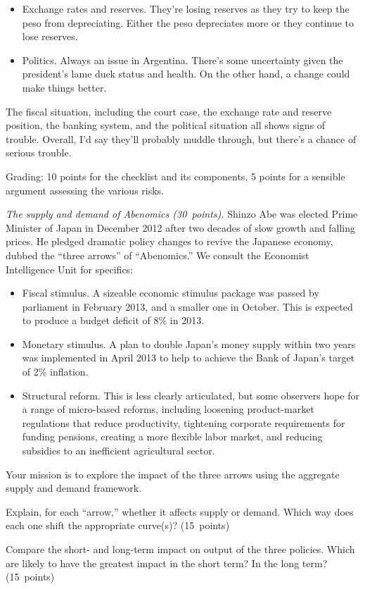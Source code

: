 \documentclass[letterpaper,12pt]{exam}
\begin{document}
\begin{questions}
\begin{solution}
\begin{parts}
\begin{itemize}
\item Exchange rates and reserves.
They're losing reserves as they try to keep the peso
from depreciating.
Either the peso depreciates more or they continue to lose reserves.

\item Politics.  Always an issue in Argentina.
There's some uncertainty given the president's lame duck status and health.
On the other hand, a change could make things better.
\end{itemize}
%
The fiscal situation, including the court case, the exchange rate and reserve position,
the banking system, and the political situation all shows signs of trouble.
Overall, I'd say they'll probably muddle through,
but there's a chance of serious trouble.

Grading:  10 points for the checklist and its components,
5 points for a sensible argument assessing the various risks.
\end{parts}
\end{solution}


\item  {\it The supply and demand of Abenomics (30~points).\/}
Shinzo Abe was elected Prime Minister of Japan in December 2012
after two decades of slow growth and falling prices.
He pledged dramatic policy changes to revive the Japanese economy,
dubbed the ``three arrows'' of ``Abenomics.''
We consult the Economist Intelligence Unit for specifics:
%
\begin{itemize}
\item Fiscal stimulus.  A sizeable economic stimulus package was passed by parliament in
February 2013, and a smaller one in October.
This is expected to produce a budget deficit of 8\% in 2013.
\item Monetary stimulus. A plan to double Japan's
money supply within two years was implemented in April 2013 to help to achieve the Bank of Japan's
target of 2\%  inflation.
\item Structural reform.
This is less clearly articulated, but some observers hope for a range of micro-based reforms,
including loosening product-market regulations that reduce productivity,
tightening corporate requirements for funding pensions,
creating a more flexible labor market,
and reducing subsidies to an inefficient agricultural sector.
\end{itemize}
%
Your mission is to explore the impact of the three arrows using the aggregate supply and demand
framework.
\begin{parts}
\item Explain, for each ``arrow,'' whether it affects supply or demand.
Which way does each one shift the appropriate curve(s)?
(15~points)
\item Compare the short- and long-term impact on output of the three policies.
Which are likely to have the greatest impact in the short term?
In the long term?
(15~points)
\end{parts}


\end{questions}
\end{document}
